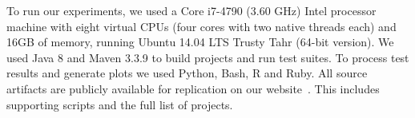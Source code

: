 \label{sec:setup}
To run our experiments, we used a Core i7-4790 (3.60 GHz) Intel processor
machine with eight virtual CPUs (four cores with two native threads each) and
16GB of memory, running Ubuntu 14.04 LTS Trusty Tahr (64-bit version).  We
used Java 8 and Maven 3.3.9 to build projects and run test
suites. To process test results and generate plots we used Python,
Bash, R and Ruby.  All source artifacts are publicly available for
replication on our website~\cite{ourwebpage}.  This includes supporting
scripts and the full list of projects.

